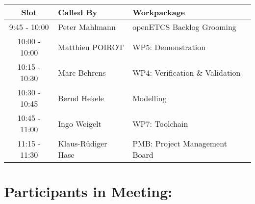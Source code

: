 \documentclass[a4paper, 11pt]{article}
\begin{document}
\begin{tabular}{|c|l|l|}
\hline
\textbf{Slot} &  \textbf{Called By} & \textbf{Workpackage} \\
\hline  
9:45 - 10:00 & Peter Mahlmann & openETCS Backlog Grooming  \\\hline
10:00 - 10:00 & Matthieu POIROT & WP5: Demonstration \\\hline
10:15 - 10:30 & Marc Behrens & WP4: Verification \& Validation \\\hline 
10:30 - 10:45 & Bernd Hekele & Modelling \\\hline
10:45 - 11:00 & Ingo Weigelt  & WP7: Toolchain \\\hline
11:15 - 11:30 & Klaus-R\"udiger Hase & PMB: Project Management Board \\\hline  
\end{tabular}

\section{Participants in Meeting:}
\end{document}
